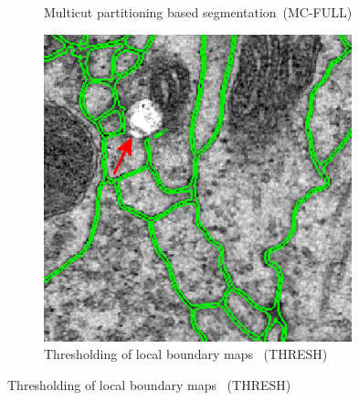 \begin{figure}
\begin{subfigure}[t]{0.46 \linewidth}
        \caption{Multicut partitioning based segmentation~(MC-FULL)} \label{fig:mc_full}
    \end{subfigure}\hspace{0.5cm}
    \begin{subfigure}[t]{0.46 \linewidth}
        \centering
        \includegraphics[width=0.98\textwidth]{figures/MWS/images/thresholded_1.png}
        \caption{Thresholding of local boundary maps ~(THRESH)} \label{fig:thresh}
    \end{subfigure}%
    

\end{figure}
